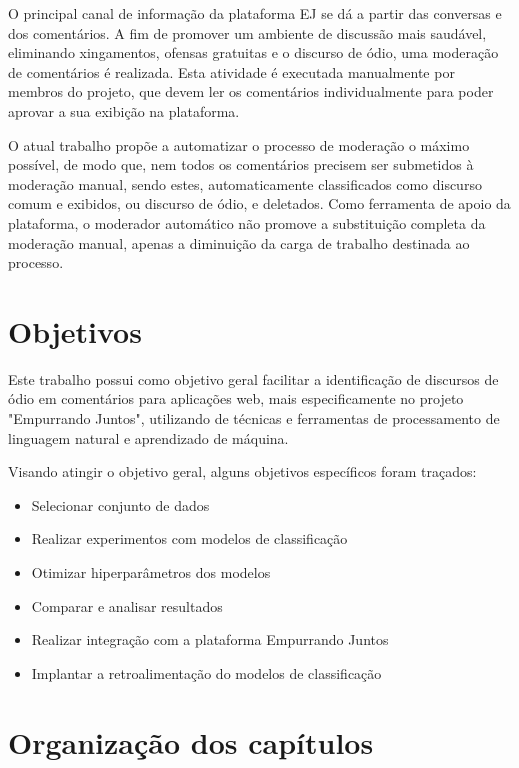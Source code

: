 O principal canal de informação da plataforma EJ se dá a partir das conversas e dos comentários. A fim de promover um ambiente de discussão mais saudável, eliminando xingamentos, ofensas gratuitas e o discurso de ódio, uma moderação de comentários é realizada. Esta atividade é executada manualmente por membros do projeto, que devem ler os comentários individualmente para poder aprovar a sua exibição na plataforma.

O atual trabalho propõe a automatizar o processo de moderação o máximo possível, de modo que, nem todos os comentários precisem ser submetidos à moderação manual, sendo estes, automaticamente classificados como discurso comum e exibidos, ou discurso de ódio, e deletados. Como ferramenta de apoio da plataforma, o moderador automático não promove a substituição completa da moderação manual, apenas a diminuição da carga de trabalho destinada ao processo.


\section[Objetivos]{Objetivos}

Este trabalho possui como objetivo geral facilitar a identificação de discursos de ódio em comentários para aplicações web, mais especificamente no projeto "Empurrando Juntos", utilizando de técnicas e ferramentas de processamento de linguagem natural e aprendizado de máquina.

Visando atingir o objetivo geral, alguns objetivos específicos foram traçados:
\begin{itemize}
    \item Selecionar conjunto de dados
    \item Realizar experimentos com modelos de classificação
    \item Otimizar hiperparâmetros dos modelos
    \item Comparar e analisar resultados
    \item Realizar integração com a plataforma Empurrando Juntos
    \item Implantar a retroalimentação do modelos de classificação
\end{itemize}

\section[Organização dos capítulos]{Organização dos capítulos}

